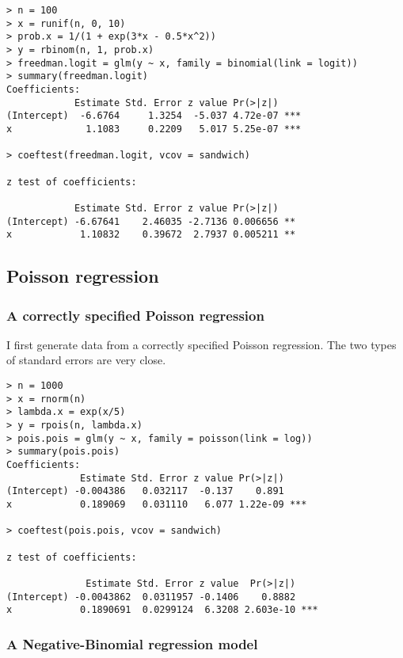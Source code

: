 \begin{lstlisting}
> n = 100
> x = runif(n, 0, 10)
> prob.x = 1/(1 + exp(3*x - 0.5*x^2))
> y = rbinom(n, 1, prob.x)
> freedman.logit = glm(y ~ x, family = binomial(link = logit))
> summary(freedman.logit)
Coefficients:
            Estimate Std. Error z value Pr(>|z|)    
(Intercept)  -6.6764     1.3254  -5.037 4.72e-07 ***
x             1.1083     0.2209   5.017 5.25e-07 ***

> coeftest(freedman.logit, vcov = sandwich)

z test of coefficients:

            Estimate Std. Error z value Pr(>|z|)   
(Intercept) -6.67641    2.46035 -2.7136 0.006656 **
x            1.10832    0.39672  2.7937 0.005211 **
\end{lstlisting}



\subsection{Poisson regression}

\subsubsection{A correctly specified Poisson regression}

I first generate data from a correctly specified Poisson regression. The two types of standard errors are very close.

\begin{lstlisting}
> n = 1000
> x = rnorm(n)
> lambda.x = exp(x/5)
> y = rpois(n, lambda.x)
> pois.pois = glm(y ~ x, family = poisson(link = log))
> summary(pois.pois)
Coefficients:
             Estimate Std. Error z value Pr(>|z|)    
(Intercept) -0.004386   0.032117  -0.137    0.891    
x            0.189069   0.031110   6.077 1.22e-09 ***

> coeftest(pois.pois, vcov = sandwich)

z test of coefficients:

              Estimate Std. Error z value  Pr(>|z|)    
(Intercept) -0.0043862  0.0311957 -0.1406    0.8882    
x            0.1890691  0.0299124  6.3208 2.603e-10 ***
\end{lstlisting}


\subsubsection{A Negative-Binomial regression model}


